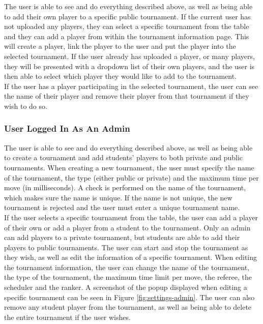 \documentclass[a4paper, 12pt]{report}
\begin{document}
The user is able to see and do everything described above, as well as being able
to add their own player to a specific public tournament. If the current user has not
uploaded any players, they can select a specific tournament from the table and
they can add a player from within the tournament information page. This will create
a player, link the player to the user and put the player into the selected
tournament. If the user already has uploaded a player, or many players, they will
be presented with a dropdown list of their own players, and the user is then able
to select which player they would like to add to the tournament. \\

If the user has a player participating in the selected tournament, the user can
see the name of their player and remove their player from that tournament if
they wish to do so.

\subsubsection*{User Logged In As An Admin}

The user is able to see and do everything described above, as well as being able
to create a tournament and add students' players to both private and public
tournaments. When creating a new tournament, the user must specify the name of
the tournament, the type (either public or private) and the maximum time per move
(in milliseconds). A check is performed on the name of the tournament, which makes
sure the name is unique. If the name is not unique, the new tournament is rejected
and the user must enter a unique tournament name. \\

If the user selects a specific tournament from the table, the user can add a player
of their own or add a player from a student to the tournament. Only an admin can
add players to a private tournament, but students are able to add their players
to public tournaments. The user can start and stop the tournament as they wish,
as well as edit the information of a specific tournament. When editing the
tournament information, the user can change the name of the tournament, the type
of the tournament, the maximum time limit per move, the referee, the scheduler
and the ranker. A screenshot of the popup displayed when editing a specific
tournament can be seen in Figure \ref{fig:settings-admin}. The user can also
remove any student player from the tournament, as well as being able to delete
the entire tournament if the user wishes.
\end{document}
